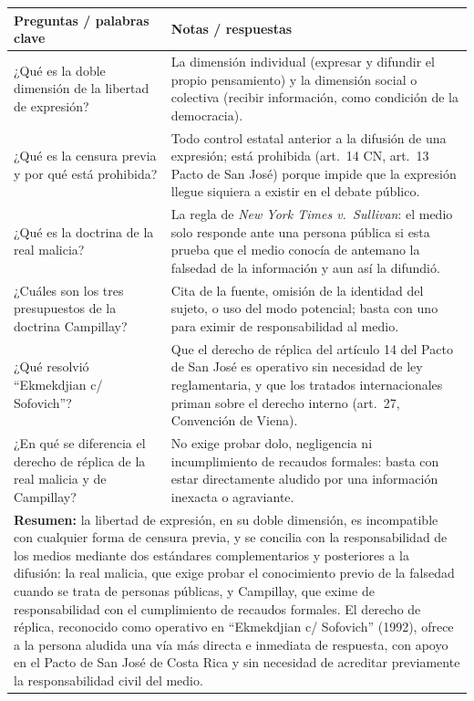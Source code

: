 \documentclass[12pt,oneside]{book}
\begin{document}
\begin{longtable}{@{}p{}p{}@{}}
\toprule
\textbf{Preguntas / palabras clave} & \textbf{Notas / respuestas} \\
\midrule
\endhead
¿Qué es la doble dimensión de la libertad de expresión? & La dimensión individual
(expresar y difundir el propio pensamiento) y la dimensión social o colectiva
(recibir información, como condición de la democracia). \\
¿Qué es la censura previa y por qué está prohibida? & Todo control estatal
anterior a la difusión de una expresión; está prohibida (art.\ 14 CN, art.\ 13
Pacto de San José) porque impide que la expresión llegue siquiera a existir en el
debate público. \\
¿Qué es la doctrina de la real malicia? & La regla de \textit{New York Times v.\
Sullivan}: el medio solo responde ante una persona pública si esta prueba que el
medio conocía de antemano la falsedad de la información y aun así la difundió. \\
¿Cuáles son los tres presupuestos de la doctrina Campillay? & Cita de la fuente,
omisión de la identidad del sujeto, o uso del modo potencial; basta con uno para
eximir de responsabilidad al medio. \\
¿Qué resolvió ``Ekmekdjian c/ Sofovich''? & Que el derecho de réplica del
artículo 14 del Pacto de San José es operativo sin necesidad de ley reglamentaria,
y que los tratados internacionales priman sobre el derecho interno (art.\ 27,
Convención de Viena). \\
¿En qué se diferencia el derecho de réplica de la real malicia y de Campillay? &
No exige probar dolo, negligencia ni incumplimiento de recaudos formales: basta
con estar directamente aludido por una información inexacta o agraviante. \\
\midrule
\multicolumn{2}{p{0.95\textwidth}}{\textbf{Resumen:} la libertad de expresión, en
su doble dimensión, es incompatible con cualquier forma de censura previa, y se
concilia con la responsabilidad de los medios mediante dos estándares
complementarios y posteriores a la difusión: la real malicia, que exige probar el
conocimiento previo de la falsedad cuando se trata de personas públicas, y
Campillay, que exime de responsabilidad con el cumplimiento de recaudos
formales. El derecho de réplica, reconocido como operativo en ``Ekmekdjian c/
Sofovich'' (1992), ofrece a la persona aludida una vía más directa e inmediata de
respuesta, con apoyo en el Pacto de San José de Costa Rica y sin necesidad de
acreditar previamente la responsabilidad civil del medio.} \\
\bottomrule
\end{longtable}
\end{document}
